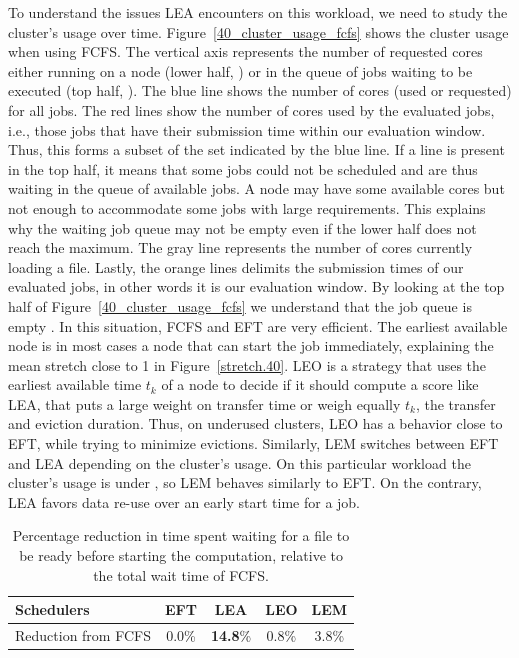 \documentclass[sigconf,review,anonymous]{acmart}
\newcommand{\rev}[1]{{\color{blue}{#1}}}
\begin{document}
To understand the issues LEA encounters on this workload, we need to study the cluster's usage over time.
Figure~\ref{40_cluster_usage_fcfs} shows the cluster usage when using FCFS.
The vertical axis represents the number of requested cores either running on a
node (lower half, \rev{the maximum is the total number of cores on our cluster: 9720}) or in the queue of jobs waiting to be executed (top
half, \rev{where the number of requested cores can be much higher than the cluster's capability}).
The blue line shows the number of cores (used or requested) for all jobs.
The red lines show the number of cores used by the evaluated jobs, i.e.,
those jobs that have their submission time within our evaluation window. Thus, this forms a subset
of the set indicated by the blue line.
If a line is present in the top half, it means that some jobs could not be scheduled
and are thus waiting in the queue of available jobs. 
A node may have some available cores but not enough to accommodate some jobs with large requirements.
This explains why the waiting job queue may not be empty even if the lower half does not reach the maximum.
The gray line represents the number of cores currently loading a file.
Lastly, the orange lines delimits the submission times of our 
evaluated jobs, in other words it is our evaluation window.
By looking at the top half of Figure~\ref{40_cluster_usage_fcfs}
we understand that the job queue is empty \rev{for more than half of the evaluation window}.
In this situation, FCFS and EFT are very efficient. The earliest available node is in
most cases a node that can start the job immediately, explaining the mean stretch close to 1 in Figure~\ref{stretch.40}.
LEO is a strategy that uses the earliest available time $t_k$ of a node to decide if it should compute a score like LEA,
that puts a large weight on transfer time
or weigh equally $t_k$, the transfer and eviction duration. 
Thus, on underused clusters, LEO has a behavior close to EFT, while trying to minimize evictions.
Similarly, LEM switches between EFT and LEA depending on the cluster's usage.
On this particular workload the cluster's usage is under \rev{100\% more than half the time}, so LEM behaves similarly to EFT.
On the contrary, LEA favors data re-use over an early start time for a job.
\begin{table}
\begin{tabular}{ l c c c c }
  \toprule
  Schedulers & EFT & \textbf{LEA} & LEO & LEM \\
  \midrule
  Reduction from FCFS & 0.0\% & \textbf{14.8}\% & 0.8\% & 3.8\% \\ %
  \bottomrule
\end{tabular}
\caption{Percentage reduction in time spent waiting for a file to be ready before starting the computation, relative to the total wait time of FCFS.}\label{tab.40}
\end{table}
\end{document}

